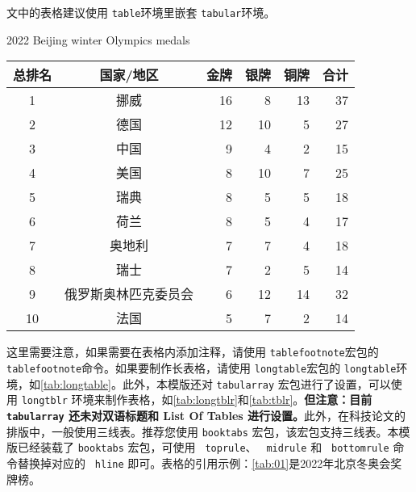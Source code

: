 文中的表格建议使用 \texttt{table}环境里嵌套 \texttt{tabular}环境。
\begin{table}[htbp]
    {2022 Beijing winter Olympics medals}
    \label{tab:01}
    \centering
    \begin{tabular}{ccrrrr}
        \toprule
        总排名 & 国家/地区 & 金牌 & 银牌 & 铜牌 & 合计  \\ 
        \midrule
        1 & 挪威 & 16 & 8 & 13 & 37\\
        2 & 德国 & 12 & 10 & 5 & 27\\
        3 & 中国 & 9 & 4 & 2 & 15\\
        4 & 美国 & 8 & 10 & 7 & 25\\
        5 & 瑞典 & 8 & 5 & 5 & 18\\
        6 & 荷兰 & 8 & 5 & 4 & 17\\
        7 & 奥地利 & 7 & 7 & 4 & 18\\
        8 & 瑞士 & 7 & 2 & 5 & 14\\
        9 & 俄罗斯奥林匹克委员会\footnotemark & 6 & 12 & 14 & 32\\ 
        10 & 法国 & 5 & 7 & 2 & 14\\
        \bottomrule
    \end{tabular}
\end{table}
这里需要注意，如果需要在表格内添加注释，请使用 \texttt{tablefootnote}宏包的 \texttt{ tablefootnote}命令。如果要制作长表格，请使用 \texttt{longtable}宏包的 \texttt{longtable}环境，如\autoref{tab:longtable}。此外，本模版还对 \texttt{tabularray} 宏包进行了设置，可以使用 \texttt{longtblr} 环境来制作表格，如\autoref{tab:longtblr}和\autoref{tab:tblr}。\textbf{但注意：目前 \texttt{tabularray} 还未对双语标题和 List Of Tables 进行设置。}此外，在科技论文的排版中，一般使用三线表。推荐您使用 \texttt{booktabs} 宏包，该宏包支持三线表。本模版已经装载了 \texttt{booktabs} 宏包，可使用 \texttt{ toprule}、 \texttt{ midrule} 和 \texttt{ bottomrule} 命令替换掉对应的 \texttt{ hline} 即可。表格的引用示例：\autoref{tab:01}是2022年北京冬奥会奖牌榜。

